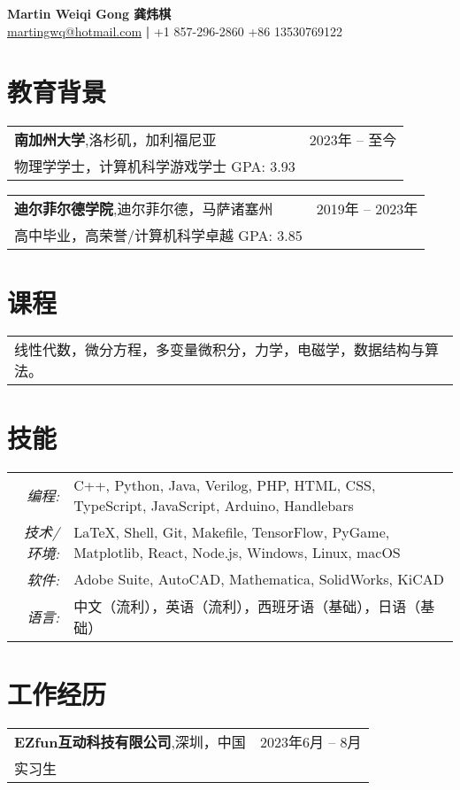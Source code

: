 \documentclass[oneside, 11pt]{article}
\newcommand*{\experienceEntry}[4]{
	\noindent
	\begin{tabularx}{\textwidth}{Xr}
	\textbf{#1},\quad #2 & #3\\
	#4 &
	\end{tabularx}
	\vspace{-0.75\baselineskip}
}
\begin{document}
\begin{center}
	\Large \textbf{Martin Weiqi Gong 龚炜棋}\\
	\normalsize \href{mailto:martingwq@hotmail.com}{martingwq@hotmail.com} \thinspace \textbf{|} \thinspace +1 857-296-2860 \thinspace +86 13530769122
\end{center}

\section*{教育背景}

\experienceEntry{南加州大学}
  {洛杉矶，加利福尼亚}
  {2023年 -- 至今}
  {物理学学士，计算机科学游戏学士 \quad GPA: 3.93}

\experienceEntry{迪尔菲尔德学院}
  {迪尔菲尔德，马萨诸塞州}
  {2019年 -- 2023年}
  {高中毕业，高荣誉/计算机科学卓越 \quad GPA: 3.85}

\section*{课程}

\begin{tabular}{p{\textwidth - 1em}}
  线性代数，微分方程，多变量微积分，力学，电磁学，数据结构与算法。
\end{tabular}

\section*{技能}

\begin{tabularx}{\textwidth}{rX}
  \textit{编程:} & C++, Python, Java, Verilog, PHP, HTML, CSS, TypeScript, JavaScript, Arduino, Handlebars\\
  \textit{技术/环境:} & \LaTeX, Shell, Git, Makefile, TensorFlow, PyGame, Matplotlib, React, Node.js, Windows, Linux, macOS\\
  \textit{软件:} & Adobe Suite, AutoCAD, Mathematica, SolidWorks, KiCAD\\
  \textit{语言:} & 中文（流利），英语（流利），西班牙语（基础），日语（基础）
\end{tabularx}

\section*{工作经历}

\experienceEntry{EZfun互动科技有限公司}
  {深圳，中国}
  {2023年6月 -- 8月}
  {实习生}
\end{document}
